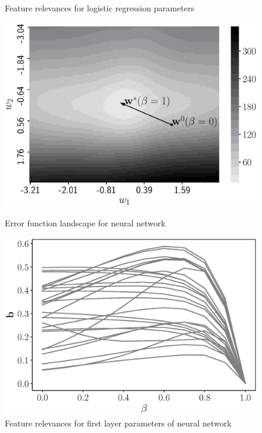\documentclass[
11pt,%
tightenlines,%
twoside,%
onecolumn,%
nofloats,%
nobibnotes,%
nofootinbib,%
superscriptaddress,%
noshowpacs,%
centertags]%
{revtex4}
\begin{document}
\begin{figure}
\begin{minipage}{.5\textwidth}
		\caption{Feature relevances for logistic regression parameters}
		\label{fig:log_reg_b_wrt_beta}
	\end{minipage}
\end{figure}
\begin{figure}[!h]
	\centering
	\begin{minipage}{.5\textwidth}
		\setcaptionmargin{5mm}
		\onelinecaptionsfalse %
		\centering
		\includegraphics[width=\linewidth]{figs/gray_neural_error.eps}
		\caption{Error function landscape for neural network}
		\label{fig:neural_error}
	\end{minipage}%
	\begin{minipage}{.5\textwidth}
		\setcaptionmargin{5mm}
		\onelinecaptionsfalse %
		\centering
		\includegraphics[width=\linewidth]{figs/gray_neural_b_wrt_beta.eps}
		\caption{Feature relevances for first layer parameters of neural network}
		\label{fig:neural_b_wrt_beta}
	\end{minipage}
\end{figure}
\end{document}
